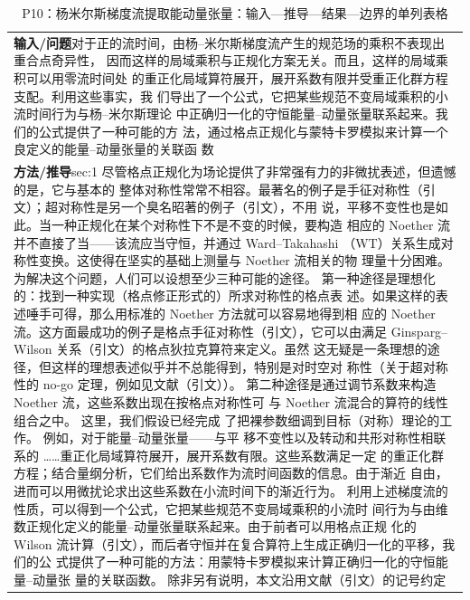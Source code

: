\documentclass[UTF8,11pt,oneside]{ctexbook}
\begin{document}
\begin{table}[htbp]
  \centering
  \caption*{P10：杨米尔斯梯度流提取能动量张量：输入—推导—结果—边界的单列表格}
  \small
  \begin{tabular}{@{}p{}@{}}
    \toprule
    \textbf{输入/问题}\quad 对于正的流时间，由杨–米尔斯梯度流产生的规范场的乘积不表现出重合点奇异性， 因而这样的局域乘积与正规化方案无关。而且，这样的局域乘积可以用零流时间处 的重正化局域算符展开，展开系数有限并受重正化群方程支配。利用这些事实，我 们导出了一个公式，它把某些规范不变局域乘积的小流时间行为与杨–米尔斯理论 中正确归一化的守恒能量–动量张量联系起来。我们的公式提供了一种可能的方 法，通过格点正规化与蒙特卡罗模拟来计算一个良定义的能量–动量张量的关联函 数 \\
    \textbf{方法/推导}\quad sec:1 尽管格点正规化为场论提供了非常强有力的非微扰表述，但遗憾的是，它与基本的 整体对称性常常不相容。最著名的例子是手征对称性（引文）；超对称性是另一个臭名昭著的例子（引文），不用 说，平移不变性也是如此。当一种正规化在某个对称性下不是不变的时候，要构造 相应的 Noether 流并不直接了当——该流应当守恒，并通过 Ward–Takahashi （WT）关系生成对称性变换。这使得在坚实的基础上测量与 Noether 流相关的物 理量十分困难。为解决这个问题，人们可以设想至少三种可能的途径。 第一种途径是理想化的：找到一种实现（格点修正形式的）所求对称性的格点表 述。如果这样的表述唾手可得，那么用标准的 Noether 方法就可以容易地得到相 应的 Noether 流。这方面最成功的例子是格点手征对称性（引文），它可以由满足 Ginsparg–Wilson 关系（引文）的格点狄拉克算符来定义。虽然 这无疑是一条理想的途径，但这样的理想表述似乎并不总能得到，特别是对时空对 称性（关于超对称性的 no-go 定理，例如见文献（引文））。 第二种途径是通过调节系数来构造 Noether 流，这些系数出现在按格点对称性可 与 Noether 流混合的算符的线性组合之中。 这里，我们假设已经完成 了把裸参数细调到目标（对称）理论的工作。 例如，对于能量–动量张量——与平 移不变性以及转动和共形对称性相联系的 ……重正化局域算符展开，展开系数有限。这些系数满足一定 的重正化群方程；结合量纲分析，它们给出系数作为流时间函数的信息。由于渐近 自由，进而可以用微扰论求出这些系数在小流时间下的渐近行为。 利用上述梯度流的性质，可以得到一个公式，它把某些规范不变局域乘积的小流时 间行为与由维数正规化定义的能量–动量张量联系起来。由于前者可以用格点正规 化的 Wilson 流计算（引文），而后者守恒并在复合算符上生成正确归一化的平移，我们的公 式提供了一种可能的方法：用蒙特卡罗模拟来计算正确归一化的守恒能量–动量张 量的关联函数。 除非另有说明，本文沿用文献（引文）的记号约定 \\

\end{tabular}
\end{table}
\end{document}
